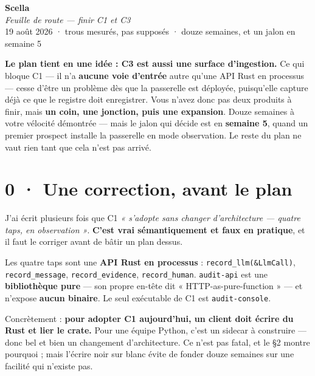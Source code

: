 \documentclass[10pt]{article}
\newcommand{\code}[1]{\texttt{\small #1}}
\begin{document}
\begin{center}
{\Huge\bfseries\color{navy} Scella}\\[4pt]
{\large\color{grey}\itshape Feuille de route --- finir C1 et C3}\\[4pt]
{\small\color{grey} 19 août 2026 \; · \; trous mesurés, pas supposés \; · \; douze semaines, et un jalon en semaine 5}
\end{center}
\vspace{2pt}

\begin{these}
\textbf{Le plan tient en une idée : C3 est aussi une surface d'ingestion.} Ce qui bloque C1 --- il n'a
\textbf{aucune voie d'entrée} autre qu'une API Rust en processus --- cesse d'être un problème dès que
la passerelle est déployée, puisqu'elle capture déjà ce que le registre doit enregistrer. Vous
n'avez donc pas deux produits à finir, mais \textbf{un coin, une jonction, puis une expansion}. Douze
semaines à votre vélocité démontrée --- mais le jalon qui décide est en \textbf{semaine 5}, quand un
premier prospect installe la passerelle en mode observation. Le reste du plan ne vaut rien tant que
cela n'est pas arrivé.
\end{these}

\section{0 · Une correction, avant le plan}

\begin{alerte}
J'ai écrit plusieurs fois que C1 \emph{« s'adopte sans changer d'architecture --- quatre taps, en
observation »}. \textbf{C'est vrai sémantiquement et faux en pratique}, et il faut le corriger avant de
bâtir un plan dessus.

Les quatre taps sont une \textbf{API Rust en processus} : \code{record\_llm(\&LlmCall)},
\code{record\_message}, \code{record\_evidence}, \code{record\_human}. \code{audit-api} est une
\textbf{bibliothèque pure} --- son propre en-tête dit « HTTP-as-pure-function » --- et n'expose
\textbf{aucun binaire}. Le seul exécutable de C1 est \code{audit-console}.

Concrètement : \textbf{pour adopter C1 aujourd'hui, un client doit écrire du Rust et lier le crate.}
Pour une équipe Python, c'est un sidecar à construire --- donc bel et bien un changement
d'architecture. Ce n'est pas fatal, et le §2 montre pourquoi ; mais l'écrire noir sur blanc évite de
fonder douze semaines sur une facilité qui n'existe pas.
\end{alerte}
\end{document}
